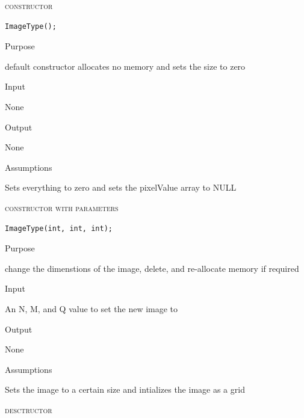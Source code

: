 \documentclass[pdftex, 11pt]{article}
\begin{document}
\begin{description}

	\item{\textsc{constructor}}
		\begin{description}

\begin{lstlisting}
ImageType();
\end{lstlisting}

			\item{Purpose}

				default constructor allocates no memory and sets the size to zero 

			\item{Input}

				None

			\item{Output}

				None

			\item{Assumptions}

				Sets everything to zero and 
				sets the pixelValue array to NULL


		\end{description}


	\item{\textsc{constructor with parameters}}
		\begin{description}

\begin{lstlisting}
ImageType(int, int, int);
\end{lstlisting}

			\item{Purpose}

				change the dimenstions of the image, delete,
				and re-allocate memory if required

			\item{Input}

				An N, M, and Q value to set the new image to

			\item{Output}

				None

			\item{Assumptions}

				Sets the image to a certain size and intializes the
				image as a grid

		\end{description}



	\item{\textsc{desctructor}}
		\begin{description}


\end{description}
\end{description}
\end{document}
